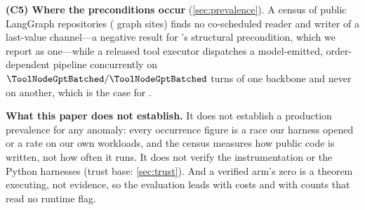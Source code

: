 \smallskip\noindent\textbf{(C5) Where the preconditions occur} (\cref{sec:prevalence}).
A census of \CensusRepos{} public LangGraph repositories (\CensusSites{} graph
sites) finds no co-scheduled reader and writer of a last-value channel---a
negative result for 's structural precondition, which we report as one---while
a released tool executor dispatches a model-emitted, order-dependent pipeline
concurrently on $\ToolNodeGptBatched/\ToolNodeGptBatched$ turns of one backbone
and never on another, which is the case for .

\smallskip\noindent\textbf{What this paper does not establish.} It does not
establish a production prevalence for any anomaly: every occurrence figure is
a race our harness opened or a rate on our own workloads, and the census
measures how public code is written, not how often it runs. It does not
verify the instrumentation or the Python harnesses (trust base:
\cref{sec:trust}). And a verified arm's zero is a theorem executing, not
evidence, so the evaluation leads with costs and with counts that read no
runtime flag.
